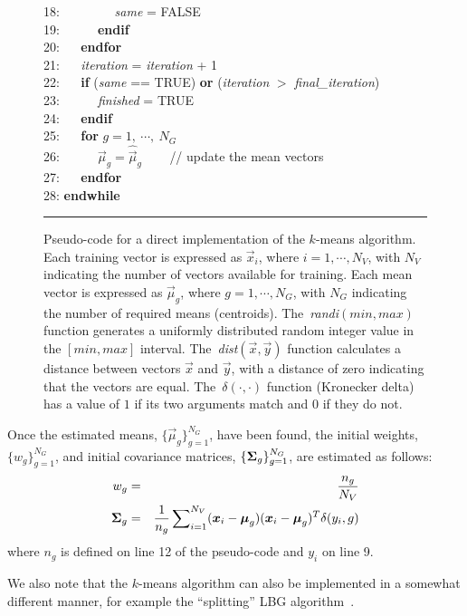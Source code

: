 \begin{figure}[!b]
\begin{small}
\begin{tabbing}
18: ~~ ~~ ~~ {\it same} = FALSE \\
19: ~~ ~~ {\bf endif} \\
20: ~~ {\bf endfor} \\
21: ~~ {\it iteration} = {\it iteration} + 1 \\
22: ~~ {\bf if} ({\it same} == TRUE) {\bf or} ({\it iteration} $>$ {\it final\_iteration})  \\
23: ~~ ~~ {\it finished} = TRUE \\
24: ~~ {\bf endif} \\
25: ~~ {\bf for} $g=1, ~\cdots, ~N_G$ \\
26: ~~ ~~ $\Vec{\mu}_g = \widehat{\Vec{\mu}}_g$ ~~~ {\small // update the mean vectors} \\
27: ~~ {\bf endfor} \\
28: {\bf endwhile}
\end{tabbing}
\end{small}
\caption
  {
  \small
  Pseudo-code for a direct implementation of the $k$-means algorithm.
  Each training vector is expressed as $\Vec{x}_i$, where $i = 1, \cdots, N_V$, with $N_V$ indicating the number of vectors available for training.
  Each mean vector is expressed as $\Vec{\mu}_g$, where $g = 1, \cdots, N_G$, with $N_G$ indicating the number of required means (centroids).
  The~{\it randi}$(min,max)$ function generates a uniformly distributed random integer value in the $[min,max]$ interval.
  The~{\it dist}$(\Vec{x},\Vec{y})$ function calculates a distance between vectors $\Vec{x}$ and $\Vec{y}$, with a distance of zero indicating that the vectors are equal.
  The~$\delta(\cdot,\cdot)$ function (Kronecker delta) has a value of $1$ if its two arguments match and $0$ if they do not.
  }
\label{fig:kmeans_pseudocode}
\hrule
\end{figure}

Once the estimated means, $\{ \Vec{\mu}_g \}_{g=1}^{N_G}$, have been found,
the initial weights, $\{ w_g \}_{g=1}^{N_G}$, and initial covariance matrices, $\{ {{\boldsymbol{\Sigma}}_g} \}_{g=1}^{N_G}$,
are estimated as follows:
%
\begin{eqnarray}
w_g & = & \frac{n_g}{N_V} \\
{\mbox {\boldmath $\Sigma$}_g} & = & \frac{1}{n_g} \sum\nolimits_{i=1}^{N_V} (\Vec{x}_i - \Vec{\mu}_g)(\Vec{x}_i - \Vec{\mu}_g)^T \delta(y_i, g)
\label{eqn:k-means_cov}
\end{eqnarray}
%
\noindent
where $n_g$ is defined on line 12 of the pseudo-code and $y_i$ on line 9.

We also note that the $k$-means algorithm can also be implemented in a somewhat different manner, 
for example the ``splitting'' LBG algorithm~\cite{Linde80}.

